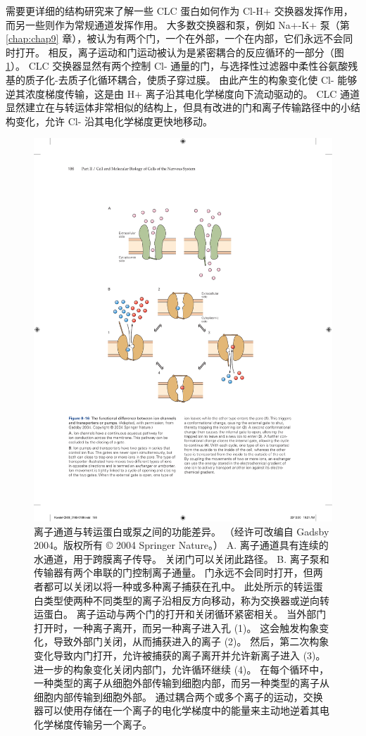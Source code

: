 需要更详细的结构研究来了解一些 CLC 蛋白如何作为 Cl-H+ 交换器发挥作用，而另一些则作为常规通道发挥作用。 
大多数交换器和泵，例如 Na+-K+ 泵（第 \ref{chap:chap9} 章），被认为有两个门，一个在外部，一个在内部，它们永远不会同时打开。 
相反，离子运动和门运动被认为是紧密耦合的反应循环的一部分（图\ref{fig:8_16}）。 
CLC 交换器显然有两个控制 Cl- 通量的门，与选择性过滤器中柔性谷氨酸残基的质子化-去质子化循环耦合，使质子穿过膜。 
由此产生的构象变化使 Cl- 能够逆其浓度梯度传输，这是由 H+ 离子沿其电化学梯度向下流动驱动的。 
CLC 通道显然建立在与转运体非常相似的结构上，但具有改进的门和离子传输路径中的小结构变化，允许 Cl- 沿其电化学梯度更快地移动。

\begin{figure}[htbp]
	\centering
	\includegraphics[width=0.6\linewidth]{chap08/fig_8_16}
	\caption{离子通道与转运蛋白或泵之间的功能差异。 （经许可改编自 Gadsby 2004。版权所有 © 2004 Springer Nature。） A. 离子通道具有连续的水通道，用于跨膜离子传导。 关闭门可以关闭此路径。 B. 离子泵和传输器有两个串联的门控制离子通量。 门永远不会同时打开，但两者都可以关闭以将一种或多种离子捕获在孔中。 此处所示的转运蛋白类型使两种不同类型的离子沿相反方向移动，称为交换器或逆向转运蛋白。 离子运动与两个门的打开和关闭循环紧密相关。 当外部门打开时，一种离子离开，而另一种离子进入孔 (1)。 这会触发构象变化，导致外部门关闭，从而捕获进入的离子 (2)。 然后，第二次构象变化导致内门打开，允许被捕获的离子离开并允许新离子进入 (3)。 进一步的构象变化关闭内部门，允许循环继续 (4)。 在每个循环中，一种类型的离子从细胞外部传输到细胞内部，而另一种类型的离子从细胞内部传输到细胞外部。 通过耦合两个或多个离子的运动，交换器可以使用存储在一个离子的电化学梯度中的能量来主动地逆着其电化学梯度传输另一个离子。}
	\label{fig:8_16}
\end{figure}





